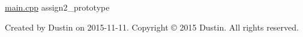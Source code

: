 \hyperlink{main_8cpp}{main.\+cpp} assign2\+\_\+prototype

Created by Dustin on 2015-\/11-\/11. Copyright © 2015 Dustin. All rights reserved. 